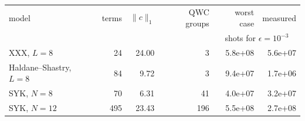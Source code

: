 \begin{tabular}{l r r r r r}
\toprule
model & terms & $\|c\|_1$ & QWC groups & worst case & measured \\
& & & & \multicolumn{2}{c}{shots for $\epsilon=10^{-3}$} \\
\midrule
XXX, $L=8$ & 24 & 24.00 & 3 & 5.8e+08 & 5.6e+07 \\
Haldane--Shastry, $L=8$ & 84 & 9.72 & 3 & 9.4e+07 & 1.7e+06 \\
SYK, $N=8$ & 70 & 6.31 & 41 & 4.0e+07 & 3.2e+07 \\
SYK, $N=12$ & 495 & 23.43 & 196 & 5.5e+08 & 2.7e+08 \\
\bottomrule
\end{tabular}
